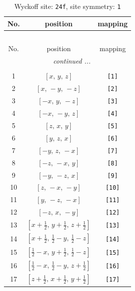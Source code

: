\documentclass[fleqn,8pt]{jsarticle}
\begin{document}
\begin{longtable}{ccc}
\caption{Wyckoff site: {\tt 24f}, site symmetry: {\tt 1}}
 \\
 \hline \hline
No. & position & mapping \\ \hline \endfirsthead

\multicolumn{2}{l}{\tablename\ \thetable{}} \\
 \hline \hline
No. & position & mapping \\ \hline \endhead

 \hline \hline
\multicolumn{2}{r}{\footnotesize\it continued ...} \\ \endfoot

 \hline \hline
\multicolumn{2}{r}{} \\ \endlastfoot

1 & $\left[ x,\, y,\, z \right]$ & {\tt [1]} \\ \hline
2 & $\left[ x,\, - y,\, - z \right]$ & {\tt [2]} \\ \hline
3 & $\left[ - x,\, y,\, - z \right]$ & {\tt [3]} \\ \hline
4 & $\left[ - x,\, - y,\, z \right]$ & {\tt [4]} \\ \hline
5 & $\left[ z,\, x,\, y \right]$ & {\tt [5]} \\ \hline
6 & $\left[ y,\, z,\, x \right]$ & {\tt [6]} \\ \hline
7 & $\left[ - y,\, z,\, - x \right]$ & {\tt [7]} \\ \hline
8 & $\left[ - z,\, - x,\, y \right]$ & {\tt [8]} \\ \hline
9 & $\left[ - y,\, - z,\, x \right]$ & {\tt [9]} \\ \hline
10 & $\left[ z,\, - x,\, - y \right]$ & {\tt [10]} \\ \hline
11 & $\left[ y,\, - z,\, - x \right]$ & {\tt [11]} \\ \hline
12 & $\left[ - z,\, x,\, - y \right]$ & {\tt [12]} \\ \hline
13 & $\left[ x + \frac{1}{2},\, y + \frac{1}{2},\, z + \frac{1}{2} \right]$ & {\tt [13]} \\ \hline
14 & $\left[ x + \frac{1}{2},\, \frac{1}{2} - y,\, \frac{1}{2} - z \right]$ & {\tt [14]} \\ \hline
15 & $\left[ \frac{1}{2} - x,\, y + \frac{1}{2},\, \frac{1}{2} - z \right]$ & {\tt [15]} \\ \hline
16 & $\left[ \frac{1}{2} - x,\, \frac{1}{2} - y,\, z + \frac{1}{2} \right]$ & {\tt [16]} \\ \hline
17 & $\left[ z + \frac{1}{2},\, x + \frac{1}{2},\, y + \frac{1}{2} \right]$ & {\tt [17]} \\ \hline

\end{longtable}
\end{document}
